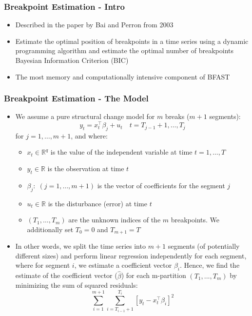 \documentclass[presentation.tex]{subfiles}
\begin{document}
\begin{frame}
\frametitle{Breakpoint Estimation - Intro}
\begin{itemize}
  \item Described in the paper by Bai and Perron from 2003
  \item Estimate the optimal position of breakpoints in a time series using
    a dynamic programming algorithm and estimate the optimal number of breakpoints
    Bayesian Information Criterion (BIC)
  \item The most memory and computationally intensive component of BFAST
\end{itemize}
\end{frame}


\begin{frame}
\frametitle{Breakpoint Estimation - The Model}
\begin{itemize}
  \item 
We assume a pure structural change model for $m$ breaks ($m+1$ segments):
\[
y_{t} = x_{t}^{\top} \beta_{j}+u_{t} \quad t=T_{j-1}+1, \ldots, T_{j}
\]
for $j = 1,\hdots , m+1$, and where:
\vspace{2.5mm}
\begin{itemize}
\item $x_t \in \mathbb{R}^q$ is the value of the independent variable at time
  $t = 1,\hdots , T$
\item $y_{t} \in \mathbb{R}$ is the observation at time $t$
\item $\beta_j: \; (j=1, \hdots ,m+1)$ is the vector of coefficients for the segment $j$
\item $u_{t} \in \mathbb{R}$ is the disturbance (error) at time $t$
\item $(T_1, \hdots ,T_m)$ are the unknown indices of the $m$ breakpoints.
 We additionally set $T_0 = 0$ and $T_{m+1} = T$
\end{itemize}
\item 
In other words, we split the time series into $m+1$ segments (of potentially
different sizes) and perform linear
regression independently for each segment, where for segment $i$, we estimate
a coefficient vector $\beta_i$.
Hence, we find the estimate of the coefficient vector ($\hat{\beta}$) for each
m-partition $(T_1, ..., T_m)$ by minimizing the sum of squared residuals:
\[
\sum_{i=1}^{m+1}\sum_{i=T_{i-1} + 1}^{T_i} \left[ y_t - x_t^{\top}\beta_i \right]^2
\]
\end{itemize}
\end{frame}
\end{document}
